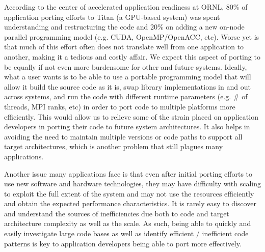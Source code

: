 According to the center of accelerated application readiness at ORNL, 80\% of application porting efforts to Titan (a \acs{GPU}-based system) was spent understanding and restructuring the code and 20\% on adding a new on-node parallel programming model (e.g. CUDA, OpenMP/OpenACC, etc).
Worse yet is that much of this effort often does not translate well from one application to another, making it a tedious and costly affair.
We expect this aspect of porting to be equally if not even more burdensome for other and future systems.
Ideally, what a user wants is to be able to use a portable programming model that will allow it build the source code as it is, swap library implementations in and out across systems, and run the code with different runtime parameters (e.g. \# of threads, MPI ranks, etc) in order to port code to multiple platforms more efficiently. This would allow us to relieve some of the strain placed on application developers in porting their code to future system architectures.
It also helps in avoiding the need to maintain multiple versions or code paths to support all target architectures, which is another problem that still plagues many applications.

Another issue many applications face is that even after initial porting efforts to use new software and hardware technologies, they may have difficulty with scaling to exploit the full extent of the system and may not use the resources efficiently and obtain the expected performance characteristics.
It is rarely easy to discover and understand the sources of inefficiencies due both to code and target architecture complexity as well as the scale.
As such, being able to quickly and easily investigate large code bases as well as identify efficient / inefficient code patterns is key to application developers being able to port more effectively.





